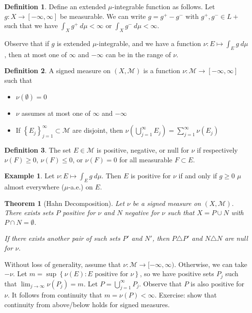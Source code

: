 \documentclass[11pt]{article}
\newtheorem{thm}{Theorem}[section]
\theoremstyle{definition}
\newtheorem{defn}{Definition}[section]
\newtheorem{example}{Example}[section]
\newcommand{\set}[1]{\left\{ #1 \right\}}
\newcommand{\m}[1]{\mathcal{#1}}
\begin{document}
\begin{defn}
  Define an extended $\mu$-integrable function as follows.  Let $g:X\to[-\infty,\infty]$
  be measurable. We can write $g=g^+-g^-$ with $g^+,g^-\in L+$ such that we have
  $\int_Xg^+~d\mu<\infty$ or $\int_Xg^-~d\mu<\infty$. 
\end{defn}

Observe that if $g$ is extended $\mu$-integrable, and we have a function
$\nu:E\mapsto\int_Eg~d\mu$, then at most one of $\infty$ and $-\infty$ can be in the range
of $\nu$. 

\begin{defn}
  A signed measure on $(X,\m{M})$ is a function $\nu:\m{M}\to[-\infty,\infty]$ such that
  \begin{itemize}
    \item $\nu(\emptyset)=0$
    \item $\nu$ assumes at most one of $\infty$ and $-\infty$
    \item If $\set{E_j}_{j=1}^\infty\subset\m{M}$ are disjoint, then
    $\nu\left(\bigcup_{j=1}^\infty E_j\right) = \sum_{j=1}^\infty\nu(E_j)$
  \end{itemize}
\end{defn}

\begin{defn}
  The set $E\in\m{M}$ is positive, negative, or null for $\nu$ if respectively
  $\nu(F)\ge0$, $\nu(F)\le0$, or $\nu(F)=0$ for all measurable $F\subset E$.
\end{defn}

\begin{example}
  Let $\nu:E\mapsto\int_Eg~d\mu$. Then $E$ is positive for $\nu$ if and only if $g\ge0$
  $\mu$ almost everywhere ($\mu$-a.e.) on $E$. 
\end{example}

\begin{thm}[Hahn Decomposition]
  Let $\nu$ be a signed measure on $(X,\m{M})$. There exists sets $P$ positive for $\nu$
  and $N$ negative for $\nu$ such that $X=P\cup N$ with $P\cap N = \emptyset$.

  If there exists another pair of such sets $P'$ and $N'$, then $P\triangle P'$ and
  $N\triangle N$ are null for $\nu$. 
\end{thm}

\proof
Without loss of generality, assume that $\nu:\m{M}\to[-\infty,\infty)$. Otherwise, we can
take $-\nu$. Let $m=\sup\set{\nu(E):E\text{ positive for }\nu}$, so we have positive sets
$P_j$ such that $\lim_{j\to\infty}\nu(P_j)=m$. Let $P=\bigcup_{j=1}^\infty P_j$. Observe
that $P$ is also positive for $\nu$. It follows from continuity that $m=\nu(P)<\infty$.
{\color{red}Exercise: show that continuity from above/below holds for signed measures.}
\end{document}
